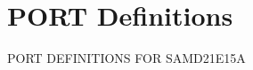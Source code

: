 \hypertarget{group___s_a_m_d21_e15_a__port}{}\section{P\+O\+RT Definitions}
\label{group___s_a_m_d21_e15_a__port}
P\+O\+RT D\+E\+F\+I\+N\+I\+T\+I\+O\+NS F\+OR S\+A\+M\+D21\+E15A 